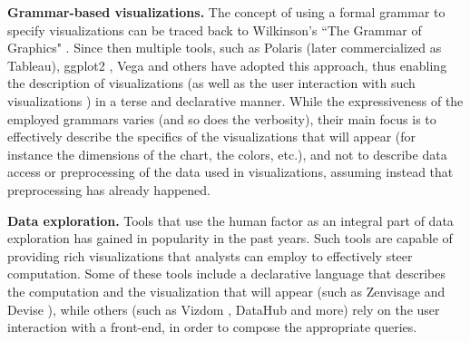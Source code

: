 
{\bf Grammar-based visualizations.} The concept of using a formal grammar to specify visualizations can be traced back to Wilkinson's ``The Grammar of Graphics" \cite{Wilkinson:2005:GG:1088896}. Since then multiple tools, such as Polaris \cite{stolte2002polaris} (later commercialized as Tableau), ggplot2 \cite{wickham2009ggplot2}, Vega \cite{satyanarayan2015vega, vega} and others \cite{ggvis, bostock2009protovis, d3} have adopted this approach, thus enabling the description of visualizations (as well as the user interaction with such visualizations \cite{Wu:2016:DAI:2939502.2939517, satyanarayan2016reactive}) in a terse and declarative manner. While the expressiveness of the employed grammars varies (and so does the verbosity), their main focus is to effectively describe the specifics of the visualizations that will appear (for instance the dimensions of the chart, the colors, etc.), and not to describe data access or preprocessing of the data used in visualizations, assuming instead that preprocessing has already happened. 

{\bf Data exploration.}  Tools that use the human factor as an integral part of data exploration has gained in popularity in the past years. Such tools are capable of providing rich visualizations that analysts can employ to effectively steer computation. Some of these tools include a declarative language that describes the computation and the visualization that will appear (such as Zenvisage \cite{DBLP:journals/corr/SiddiquiKLKP16} and Devise \cite{livny1997devise}), while others (such as Vizdom \cite{crotty2015vizdom}, DataHub \cite{Krishnan:2016:AID:2994509.2994514} and more\cite{derthick1997interactive,  bhardwaj2015collaborative, zoumpatianos2015rinse, DBLP:conf/icde/LiarouI14, Kamat:2016:TSI:2939502.2939514}) rely on the user interaction with a front-end, in order to compose the appropriate queries.


